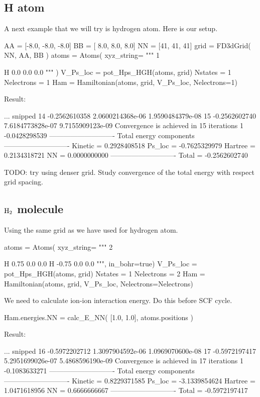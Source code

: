 \subsection{H atom}

A next example that we will try is hydrogen atom. Here is our setup.
\begin{juliacode}
AA = [-8.0, -8.0, -8.0]
BB = [ 8.0,  8.0,  8.0]
NN = [41, 41, 41]
grid = FD3dGrid( NN, AA, BB )
atoms = Atoms( xyz_string=
  """
  1

  H  0.0  0.0  0.0
  """ )
V_Ps_loc = pot_Hps_HGH(atoms, grid)
Nstates = 1
Nelectrons = 1
Ham = Hamiltonian(atoms, grid, V_Ps_loc, Nelectrons=1)
\end{juliacode}

Result:
\begin{textcode}
... snipped
14      -0.2562610358   2.0600214368e-06   1.9590484379e-08
15      -0.2562602740   7.6184773828e-07   9.7155909123e-09
Convergence is achieved in 15 iterations
1      -0.0428298539
----------------------------
Total energy components
----------------------------
Kinetic =       0.2928408518
Ps_loc  =      -0.7625329979
Hartree =       0.2134318721
NN      =       0.0000000000
----------------------------
Total   =      -0.2562602740
\end{textcode}

TODO: try using denser grid. Study convergence of the total energy with respect
grid spacing.


\subsection{$\ce{H2}$ molecule}


Using the same grid as we have used for hydrogen atom.

\begin{juliacode}
atoms = Atoms( xyz_string=
  """
  2
  
  H   0.75  0.0  0.0
  H  -0.75  0.0  0.0
  """, in_bohr=true)
V_Ps_loc = pot_Hps_HGH(atoms, grid)
Nstates = 1
Nelectrons = 2
Ham = Hamiltonian(atoms, grid, V_Ps_loc, Nelectrons=Nelectrons)
\end{juliacode}

We need to calculate ion-ion interaction energy. Do this before SCF cycle.

\begin{juliacode}
Ham.energies.NN = calc_E_NN( [1.0, 1.0], atoms.positions )
\end{juliacode}

Result:
\begin{textcode}
... snipped
16      -0.5972202712   1.3097904592e-06   1.0969070600e-08
17      -0.5972197417   5.2951699026e-07   5.4868596190e-09
Convergence is achieved in 17 iterations
1      -0.1083633271
----------------------------
Total energy components
----------------------------
Kinetic =       0.8229371585
Ps_loc  =      -3.1339854624
Hartree =       1.0471618956
NN      =       0.6666666667
----------------------------
Total   =      -0.5972197417
\end{textcode}

